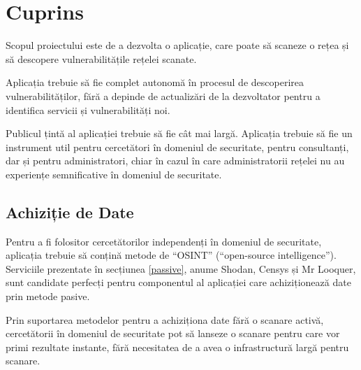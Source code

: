 \newpage

	

\newpage
\section*{Cuprins}

	\begingroup
	\renewcommand{\section}[2]{}
	\hypersetup{linkcolor=lightblue}
	\romaniantableofcontents
	\endgroup

\newpage
\pagestyle{fancy}
\section*{Scopul Proiectului}

	Scopul proiectului este de a dezvolta o aplicație, care poate să scaneze o rețea și să descopere vulnerabilitățile rețelei scanate.

	Aplicația trebuie să fie complet autonomă în procesul de descoperirea vulnerabilităților, fără a depinde de actualizări de la dezvoltator pentru a identifica servicii și vulnerabilități noi.

	Publicul țintă al aplicației trebuie să fie cât mai largă. Aplicația trebuie să fie un instrument util pentru cercetători în domeniul de securitate, pentru consultanți, dar și pentru administratori, chiar în cazul în care administratorii rețelei nu au experiențe semnificative în domeniul de securitate.

\subsection*{Achiziție de Date}

	Pentru a fi folositor cercetătorilor independenți în domeniul de securitate, aplicația trebuie să conțină metode de ``OSINT'' (``open-source intelligence''). Serviciile prezentate în secțiunea \ref{passive}, anume Shodan\cite{shodan16}, Censys\cite{censys15} și Mr Looquer\cite{looquer16}, sunt candidate perfecți pentru componentul al aplicației care achiziționează date prin metode pasive.
	
	Prin suportarea metodelor pentru a achiziționa date fără o scanare activă, cercetătorii în domeniul de securitate pot să lanseze o scanare pentru care vor primi rezultate instante, fără necesitatea de a avea o infrastructură largă pentru scanare.
	

